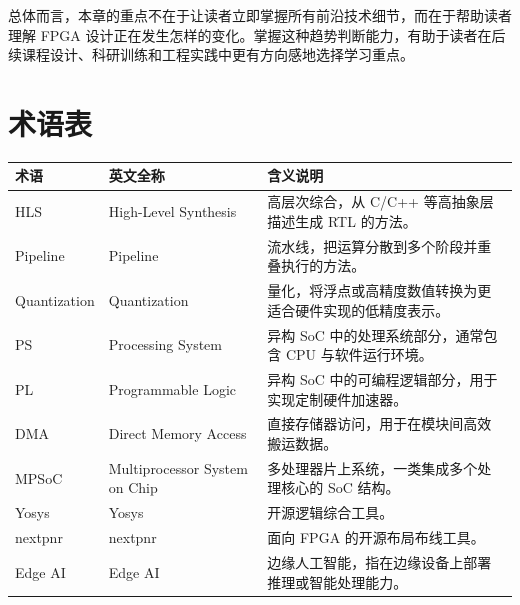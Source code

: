 总体而言，本章的重点不在于让读者立即掌握所有前沿技术细节，而在于帮助读者理解
FPGA
设计正在发生怎样的变化。掌握这种趋势判断能力，有助于读者在后续课程设计、科研训练和工程实践中更有方向感地选择学习重点。

\section{术语表}\label{ux672fux8bedux8868}

\begin{longtable}[]{@{}
  >{\raggedright\arraybackslash}p{}
  >{\raggedright\arraybackslash}p{}
  >{\raggedright\arraybackslash}p{}@{}}
\toprule\noalign{}
\begin{minipage}[b]{\linewidth}\raggedright
术语
\end{minipage} & \begin{minipage}[b]{\linewidth}\raggedright
英文全称
\end{minipage} & \begin{minipage}[b]{\linewidth}\raggedright
含义说明
\end{minipage} \\
\midrule\noalign{}
\endhead
\bottomrule\noalign{}
\endlastfoot
HLS & High-Level Synthesis & 高层次综合，从 C/C++ 等高抽象层描述生成 RTL
的方法。 \\
Pipeline & Pipeline & 流水线，把运算分散到多个阶段并重叠执行的方法。 \\
Quantization & Quantization &
量化，将浮点或高精度数值转换为更适合硬件实现的低精度表示。 \\
PS & Processing System & 异构 SoC 中的处理系统部分，通常包含 CPU
与软件运行环境。 \\
PL & Programmable Logic & 异构 SoC
中的可编程逻辑部分，用于实现定制硬件加速器。 \\
DMA & Direct Memory Access &
直接存储器访问，用于在模块间高效搬运数据。 \\
MPSoC & Multiprocessor System on Chip &
多处理器片上系统，一类集成多个处理核心的 SoC 结构。 \\
Yosys & Yosys & 开源逻辑综合工具。 \\
nextpnr & nextpnr & 面向 FPGA 的开源布局布线工具。 \\
Edge AI & Edge AI &
边缘人工智能，指在边缘设备上部署推理或智能处理能力。 \\
\end{longtable}

